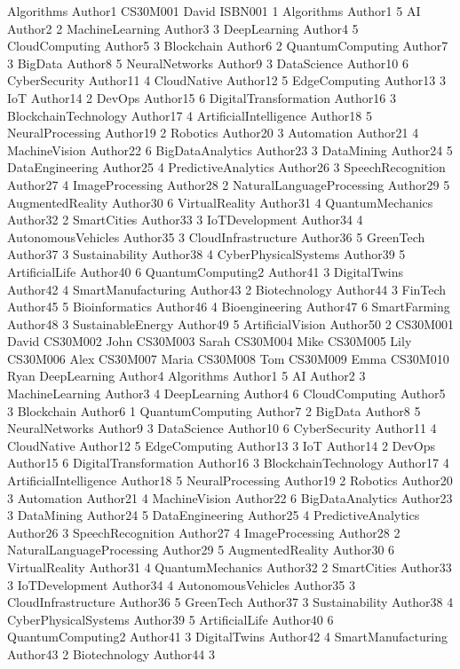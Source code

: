 Algorithms Author1
CS30M001 David ISBN001 1
Algorithms Author1 5
AI Author2 2
MachineLearning Author3 3
DeepLearning Author4 5
CloudComputing Author5 3
Blockchain Author6 2
QuantumComputing Author7 3
BigData Author8 5
NeuralNetworks Author9 3
DataScience Author10 6
CyberSecurity Author11 4
CloudNative Author12 5
EdgeComputing Author13 3
IoT Author14 2
DevOps Author15 6
DigitalTransformation Author16 3
BlockchainTechnology Author17 4
ArtificialIntelligence Author18 5
NeuralProcessing Author19 2
Robotics Author20 3
Automation Author21 4
MachineVision Author22 6
BigDataAnalytics Author23 3
DataMining Author24 5
DataEngineering Author25 4
PredictiveAnalytics Author26 3
SpeechRecognition Author27 4
ImageProcessing Author28 2
NaturalLanguageProcessing Author29 5
AugmentedReality Author30 6
VirtualReality Author31 4
QuantumMechanics Author32 2
SmartCities Author33 3
IoTDevelopment Author34 4
AutonomousVehicles Author35 3
CloudInfrastructure Author36 5
GreenTech Author37 3
Sustainability Author38 4
CyberPhysicalSystems Author39 5
ArtificialLife Author40 6
QuantumComputing2 Author41 3
DigitalTwins Author42 4
SmartManufacturing Author43 2
Biotechnology Author44 3
FinTech Author45 5
Bioinformatics Author46 4
Bioengineering Author47 6
SmartFarming Author48 3
SustainableEnergy Author49 5
ArtificialVision Author50 2
CS30M001 David
CS30M002 John
CS30M003 Sarah
CS30M004 Mike
CS30M005 Lily
CS30M006 Alex
CS30M007 Maria
CS30M008 Tom
CS30M009 Emma
CS30M010 Ryan
DeepLearning Author4
Algorithms Author1 5
AI Author2 3
MachineLearning Author3 4
DeepLearning Author4 6
CloudComputing Author5 3
Blockchain Author6 1
QuantumComputing Author7 2
BigData Author8 5
NeuralNetworks Author9 3
DataScience Author10 6
CyberSecurity Author11 4
CloudNative Author12 5
EdgeComputing Author13 3
IoT Author14 2
DevOps Author15 6
DigitalTransformation Author16 3
BlockchainTechnology Author17 4
ArtificialIntelligence Author18 5
NeuralProcessing Author19 2
Robotics Author20 3
Automation Author21 4
MachineVision Author22 6
BigDataAnalytics Author23 3
DataMining Author24 5
DataEngineering Author25 4
PredictiveAnalytics Author26 3
SpeechRecognition Author27 4
ImageProcessing Author28 2
NaturalLanguageProcessing Author29 5
AugmentedReality Author30 6
VirtualReality Author31 4
QuantumMechanics Author32 2
SmartCities Author33 3
IoTDevelopment Author34 4
AutonomousVehicles Author35 3
CloudInfrastructure Author36 5
GreenTech Author37 3
Sustainability Author38 4
CyberPhysicalSystems Author39 5
ArtificialLife Author40 6
QuantumComputing2 Author41 3
DigitalTwins Author42 4
SmartManufacturing Author43 2
Biotechnology Author44 3
